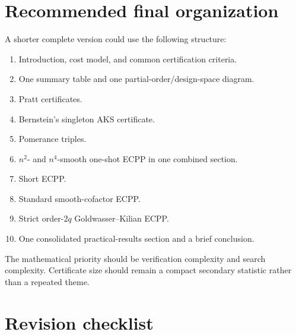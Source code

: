 \documentclass[11pt]{amsart}
\begin{document}
\section{Recommended final organization}

A shorter complete version could use the following structure:

\begin{enumerate}
\item Introduction, cost model, and common certification criteria.
\item One summary table and one partial-order/design-space diagram.
\item Pratt certificates.
\item Bernstein's singleton AKS certificate.
\item Pomerance triples.
\item $n^2$- and $n^4$-smooth one-shot ECPP in one combined section.
\item Short ECPP.
\item Standard smooth-cofactor ECPP.
\item Strict order-$2q$ Goldwasser--Kilian ECPP.
\item One consolidated practical-results section and a brief conclusion.
\end{enumerate}

The mathematical priority should be verification complexity and search complexity.  Certificate size should remain a compact secondary statistic rather than a repeated theme.

\section{Revision checklist}
\end{document}

